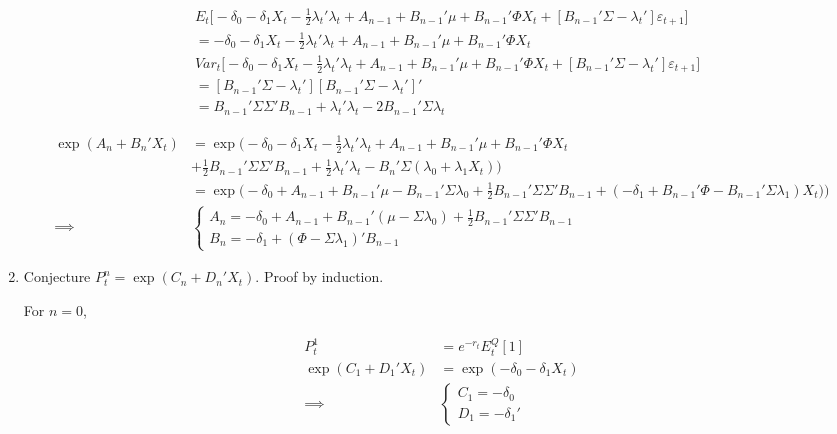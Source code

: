 \documentclass{article}
\begin{document}
\begin{enumerate}
\begin{align*}
& E_t \Bigg[-\delta_0 - \delta_1 X_t - \frac{1}{2} \lambda_t'\lambda_t  + A_{n-1} + B_{n-1}'\mu + B_{n-1}'\Phi X_t + [B_{n-1}'\Sigma - \lambda_t'] \varepsilon_{t+1}  \Bigg] \\
&=  -\delta_0 - \delta_1 X_t - \frac{1}{2} \lambda_t'\lambda_t  + A_{n-1} + B_{n-1}'\mu + B_{n-1}'\Phi X_t\\
& Var_t\Bigg[-\delta_0 - \delta_1 X_t - \frac{1}{2} \lambda_t'\lambda_t  + A_{n-1} + B_{n-1}'\mu + B_{n-1}'\Phi X_t + [B_{n-1}'\Sigma - \lambda_t'] \varepsilon_{t+1}  \Bigg] \\
&= [B_{n-1}'\Sigma - \lambda_t'][B_{n-1}'\Sigma - \lambda_t']'\\
&= B_{n-1}'\Sigma \Sigma' B_{n-1} + \lambda_t' \lambda_t - 2 B_{n-1}'\Sigma \lambda_t
\end{align*}

\begin{align*}
\exp(A_{n} + B_{n}'X_{t})
&= \exp\Bigg(-\delta_0 - \delta_1 X_t - \frac{1}{2} \lambda_t'\lambda_t  + A_{n-1} + B_{n-1}'\mu + B_{n-1}'\Phi X_t \\&+ \frac{1}{2} B_{n-1}'\Sigma \Sigma' B_{n-1} + \frac{1}{2}\lambda_t' \lambda_t - B_n'\Sigma (\lambda_0 + \lambda_1 X_t) \Bigg)\\
&= \exp\Bigg(-\delta_0   + A_{n-1} + B_{n-1}'\mu - B_{n-1}'\Sigma \lambda_0 + \frac{1}{2} B_{n-1}'\Sigma \Sigma' B_{n-1}+ (- \delta_1  + B_{n-1}'\Phi - B_{n-1}'\Sigma \lambda_1 )X_t  ) \Bigg)\\
\implies
&
\begin{cases}
A_n = - \delta_0 + A_{n-1} + B_{n-1}'(\mu - \Sigma \lambda_0) + \frac{1}{2} B_{n-1}'\Sigma \Sigma' B_{n-1}\\
B_n = - \delta_1  + (\Phi - \Sigma \lambda_1)' B_{n-1}
\end{cases}
\end{align*}

\item Conjecture $P_t^n = \exp(C_n + D_n'X_t)$. Proof by induction.

For $n=0$,

\begin{align*}
P_t^1 
&= 
e^{-r_t}E_t^Q[1]\\
\exp(C_1 + D_1'X_t) 
&= 
\exp (-\delta_0 - \delta_1 X_t) \\
\implies&
\begin{cases}
C_1 = -\delta_0\\
D_1 = -\delta_1'
\end{cases}
\end{align*}


\end{enumerate}
\end{document}
